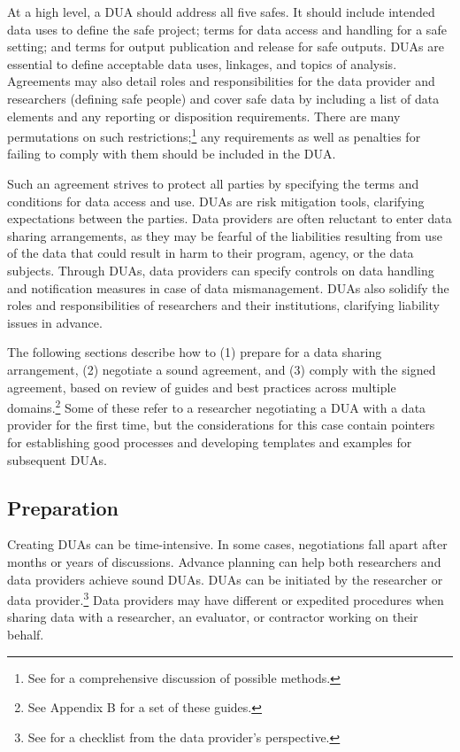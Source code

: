 \documentclass[
]{book}
\begin{document}
At a high level, a DUA should address all five safes. It should include intended data uses to define the safe project; terms for data access and handling for a safe setting; and terms for output publication and release for safe outputs. DUAs are essential to define acceptable data uses, linkages, and topics of analysis. Agreements may also detail roles and responsibilities for the data provider and researchers (defining safe people) and cover safe data by including a list of data elements and any reporting or disposition requirements. There are many permutations on such restrictions;\footnote{See \citet{goroff2018} for a comprehensive discussion of possible methods.} any requirements as well as penalties for failing to comply with them should be included in the DUA.

Such an agreement strives to protect all parties by specifying the terms and conditions for data access and use. DUAs are risk mitigation tools, clarifying expectations between the parties. Data providers are often reluctant to enter data sharing arrangements, as they may be fearful of the liabilities resulting from use of the data that could result in harm to their program, agency, or the data subjects. Through DUAs, data providers can specify controls on data handling and notification measures in case of data mismanagement. DUAs also solidify the roles and responsibilities of researchers and their institutions, clarifying liability issues in advance.

The following sections describe how to (1) prepare for a data sharing arrangement, (2) negotiate a sound agreement, and (3) comply with the signed agreement, based on review of guides and best practices across multiple domains.\footnote{See Appendix B for a set of these guides.} Some of these refer to a researcher negotiating a DUA with a data provider for the first time, but the considerations for this case contain pointers for establishing good processes and developing templates and examples for subsequent DUAs.

\hypertarget{preparation}{%
\subsection{Preparation}\label{preparation}}

Creating DUAs can be time-intensive. In some cases, negotiations fall apart after months or years of discussions. Advance planning can help both researchers and data providers achieve sound DUAs. DUAs can be initiated by the researcher or data provider.\footnote{See \citet{yates2018} for a checklist from the data provider's perspective.} Data providers may have different or expedited procedures when sharing data with a researcher, an evaluator, or contractor working on their behalf.
\end{document}
